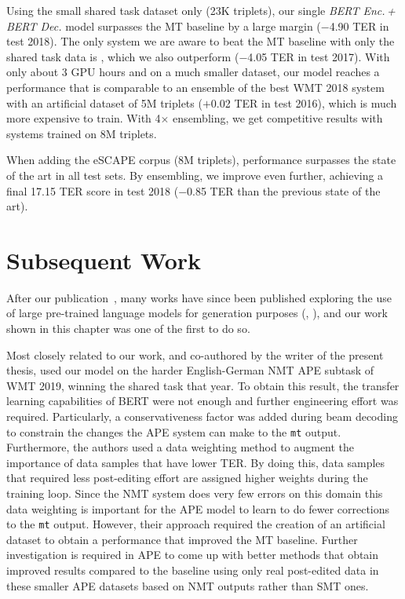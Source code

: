 Using the small shared task dataset only (23K triplets), our single
\emph{BERT Enc.\,+\,BERT Dec.} model surpasses the MT baseline by a
large margin ($-$4.90 TER in test 2018). The only system we are aware
to beat the MT baseline with only the shared task data is
\citet{berard2017lig}, which we also outperform ($-$4.05 TER in test
2017). With only about 3 GPU hours and on a much smaller dataset, our
model reaches a performance that is comparable to an ensemble of the
best WMT 2018 system with an artificial dataset of 5M triplets
($+$0.02 TER in test 2016), which is much more expensive to train.
With 4$\times$ ensembling, we get competitive results with systems
trained on 8M triplets.

When adding the eSCAPE corpus (8M triplets), performance surpasses
the state of the art in all test sets. By ensembling, we improve even
further, achieving a final 17.15 TER score in test 2018 ($-$0.85 TER
than the previous state of the art).

\section{Subsequent Work}

After our publication~\citep{Correia2019}, many works have since been
published exploring the use of large pre-trained language models for
generation purposes (\eg,
\citep{zhang2019PretrainingBasedNaturalLanguage,
    chen2020DistillingKnowledgeLearned}), and our work shown in this
chapter was one of the first to do so.

Most closely related to our work, and co-authored by the writer of
the present thesis, \citet{Lopes2019} used our model on the
harder English-German NMT APE subtask of WMT 2019, winning the shared
task that year. To obtain this result, the transfer learning
capabilities of BERT were not enough and further engineering effort
was required. Particularly, a conservativeness factor was added
during beam decoding to constrain the changes the APE system can make
to the {\tt mt} output. Furthermore, the authors used a data
weighting method to augment the importance of data samples that have
lower TER. By doing this, data samples that required less
post-editing effort are assigned higher weights during the training
loop. Since the NMT system does very few errors on this domain this
data weighting is important for the APE model to learn to do fewer
corrections to the {\tt mt} output. However, their approach required
the creation of an artificial dataset to obtain a performance that
improved the MT baseline. Further investigation is required in APE to
come up with better methods that obtain improved results compared to
the baseline using only real post-edited data in these smaller APE
datasets based on NMT outputs rather than SMT ones.

